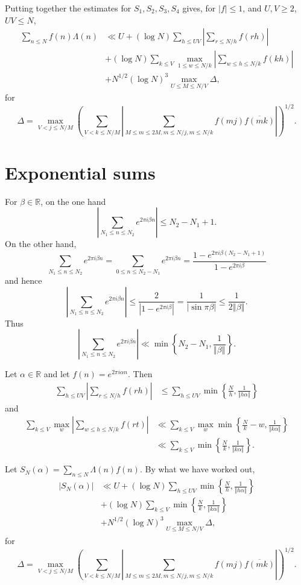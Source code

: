 \documentclass{article}
\newcommand{\norm}[1]{\left\Vert #1 \right\Vert}
\theoremstyle{definition}
\begin{document}
Putting together the estimates for $S_1,S_2,S_3,S_4$ gives, for 
$|f| \leq 1$, and $U,V \geq 2$, $UV \leq N$, 
\begin{align*}
\sum_{n \leq N} f(n) \Lambda(n) & \ll U + (\log N) \sum_{h \leq UV} \left| \sum_{r \leq N/h} f(rh) \right|\\
&+(\log N) \sum_{k \leq V} \max_{1 \leq w \leq N/k} \left| \sum_{w \leq h \leq N/k} f(kh) \right|\\
&+N^{1/2} (\log N)^3 \max_{U \leq M \leq N/V} \Delta,
\end{align*}
for
\[
\Delta = \max_{V<j\leq N/M} \left(  \sum_{V<k \leq N/M} \left|  \sum_{M \leq m \leq 2M, m\leq N/j, m \leq N/k} f(mj) \overline{f(mk)}\right| \right)^{1/2}.
\]





\section{Exponential sums}
For $\beta \in \mathbb{R}$, on the one hand
\[
\left| \sum_{N_1 \leq n \leq N_2} e^{2\pi i\beta n} \right| \leq N_2-N_1+1.
\]
On the other hand,
\[
\sum_{N_1 \leq n \leq N_2} e^{2\pi i\beta n} 
=\sum_{0 \leq n \leq N_2-N_1} e^{2\pi i\beta n} 
=\frac{1-e^{2\pi i\beta(N_2-N_1+1)}}{1-e^{2\pi i\beta}} 
\]
and hence
\[
\left| \sum_{N_1 \leq n \leq N_2} e^{2\pi i\beta n} \right| \leq \frac{2}{|1-e^{2\pi i\beta}|}
=\frac{1}{|\sin \pi \beta|}
\leq \frac{1}{2 \norm{\beta}}.
\]
Thus
\[
\left| \sum_{N_1 \leq n \leq N_2} e^{2\pi i\beta n} \right|
\ll \min\left\{N_2-N_1,\frac{1}{\norm{\beta}}\right\}.
\]

Let $\alpha \in \mathbb{R}$ and let $f(n)=e^{2\pi i\alpha n}$.
Then
\begin{align*}
\sum_{h \leq UV} \left| \sum_{r \leq N/h} f(rh)\right|&\leq 
\sum_{h \leq UV} \min\left\{\frac{N}{h}, \frac{1}{\norm{h\alpha}}\right\}
\end{align*}
and
\begin{align*}
\sum_{k \leq V} \max_w \left| \sum_{w \leq h \leq N/k} f(rt) \right|
&\ll \sum_{k \leq V} \max_w \min\left\{\frac{N}{k}-w,\frac{1}{\norm{k\alpha}}\right\}\\
&\ll \sum_{k \leq V} \min\left\{\frac{N}{k}, \frac{1}{\norm{k\alpha}}\right\}.
\end{align*}

Let $S_N(\alpha) = \sum_{n \leq N} \Lambda(n) f(n)$. By what we have worked out,
\begin{align*}
|S_N(\alpha)|&\ll U + (\log N) \sum_{h \leq UV} \min\left\{\frac{N}{h}, \frac{1}{\norm{h\alpha}}\right\}\\
&+(\log N) \sum_{k \leq V} \min\left\{\frac{N}{k}, \frac{1}{\norm{k\alpha}}\right\}\\
&+N^{1/2} (\log N)^3 \max_{U \leq M \leq N/V} \Delta,
\end{align*}
for
\[
\Delta = \max_{V<j\leq N/M} \left(  \sum_{V<k \leq N/M} \left|  \sum_{M \leq m \leq 2M, m\leq N/j, m \leq N/k} f(mj) \overline{f(mk)}\right| \right)^{1/2}.
\]
\end{document}
